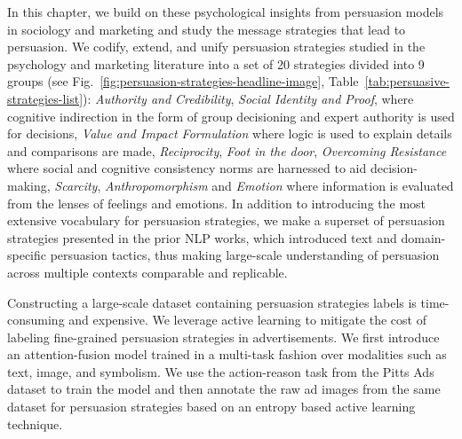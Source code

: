 In this chapter, we build on these psychological insights from persuasion models in sociology and marketing and study the message strategies that lead to persuasion. We codify, extend, and unify persuasion strategies studied in the psychology and marketing literature into a set of 20 strategies divided into 9 groups (see Fig.~\ref{fig:persuasion-strategies-headline-image}, Table~\ref{tab:persuasive-strategies-list}): \textit{Authority and Credibility}, \textit{Social Identity and Proof}, where cognitive indirection in the form of group decisioning and expert authority is used for decisions, \textit{Value and Impact Formulation} where logic is used to explain details and comparisons are made, \textit{Reciprocity}, \textit{Foot in the door}, \textit{Overcoming Resistance} where social and cognitive consistency norms are harnessed to aid decision-making, \textit{Scarcity}, \textit{Anthropomorphism} and \textit{Emotion} where information is evaluated from the lenses of feelings and emotions. In addition to introducing the most extensive vocabulary for persuasion strategies, we make a superset of persuasion strategies presented in the prior NLP works, which introduced text and domain-specific
persuasion tactics, thus making large-scale understanding of persuasion across multiple contexts comparable and replicable.


Constructing a large-scale dataset containing persuasion strategies labels is time-consuming and expensive. We leverage active learning to mitigate the cost of labeling fine-grained persuasion strategies in advertisements. We first introduce an attention-fusion model trained in a multi-task fashion over modalities such as text, image, and symbolism. We use the action-reason task from the Pitts Ads dataset \cite{hussain2017automatic} to train the model and then annotate the raw ad images from the same dataset for persuasion strategies based on an entropy based active learning technique.




